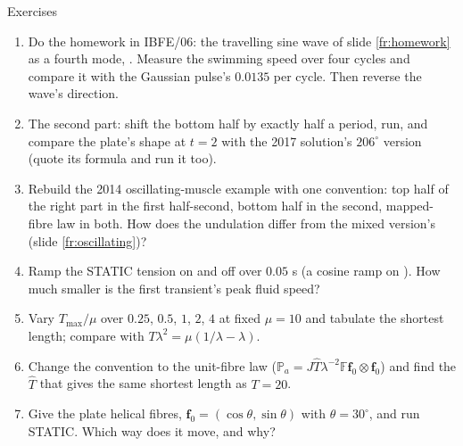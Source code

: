 \documentclass[aspectratio=169,11pt]{beamer}
\begin{document}
\begin{frame}{Exercises}
\label{fr:exercises}
\footnotesize
\begin{enumerate}
  \item Do the homework in IBFE/06: the travelling sine wave of slide \ref{fr:homework} as a fourth mode, . Measure the swimming speed over four cycles and compare it with the Gaussian pulse's $0.0135$ per cycle. Then reverse the wave's direction.
  \item The second part: shift the bottom half by exactly half a period, run, and compare the plate's shape at $t = 2$ with the 2017 solution's $206^\circ$ version (quote its formula and run it too).
  \item Rebuild the 2014 oscillating-muscle example with one convention: top half of the right part in the first half-second, bottom half in the second, mapped-fibre law in both. How does the undulation differ from the mixed version's (slide \ref{fr:oscillating})?
  \item Ramp the STATIC tension on and off over $0.05$ s (a cosine ramp on ). How much smaller is the first transient's peak fluid speed?
  \item Vary $T_{\max}/\mu$ over $0.25$, $0.5$, $1$, $2$, $4$ at fixed $\mu = 10$ and tabulate the shortest length; compare with $T\lambda^2 = \mu(1/\lambda - \lambda)$.
  \item Change the convention to the unit-fibre law ($\mathbb{P}_a = J\widehat{T}\lambda^{-2}\mathbb{F}\mathbf{f}_0\otimes\mathbf{f}_0$) and find the $\widehat{T}$ that gives the same shortest length as $T = 20$.
  \item Give the plate helical fibres, $\mathbf{f}_0 = (\cos\theta, \sin\theta)$ with $\theta = 30^\circ$, and run STATIC. Which way does it move, and why?
\end{enumerate}
\end{frame}
\end{document}
